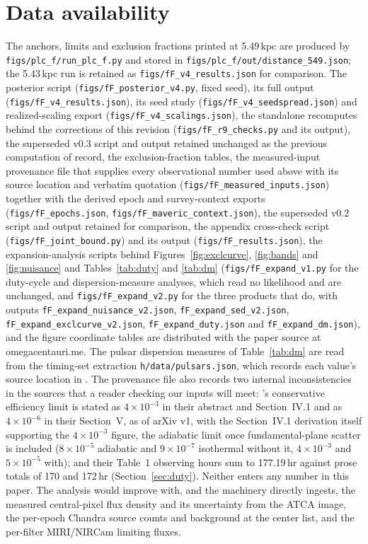 \documentclass[11pt]{article}
\begin{document}
\section*{Data availability}
\begin{sloppypar}
The anchors, limits and exclusion fractions printed at 5.49\,kpc are produced by \texttt{figs/plc\_f/run\_plc\_f.py} and stored in \texttt{figs/plc\_f/out/distance\_549.json}; the 5.43\,kpc run is retained as \texttt{figs/fF\_v4\_results.json} for comparison. The posterior script (\texttt{figs/fF\_posterior\_v4.py}, fixed seed), its full output (\texttt{figs/fF\_v4\_results.json}), its seed study (\texttt{figs/fF\_v4\_seedspread.json}) and realized-scaling export (\texttt{figs/fF\_v4\_scalings.json}), the standalone recomputes behind the corrections of this revision (\texttt{figs/fF\_r9\_checks.py} and its output), the superseded v0.3 script and output retained unchanged as the previous computation of record, the exclusion-fraction tables, the measured-input provenance file that supplies every observational number used above with its source location and verbatim quotation (\texttt{figs/fF\_measured\_inputs.json}) together with the derived epoch and survey-context exports (\texttt{figs/fF\_epochs.json}, \texttt{figs/fF\_maveric\_context.json}), the superseded v0.2 script and output retained for comparison, the appendix cross-check script (\texttt{figs/fF\_joint\_bound.py}) and its output (\texttt{figs/fF\_results.json}), the expansion-analysis scripts behind Figures~\ref{fig:exclcurve}, \ref{fig:bands} and \ref{fig:nuisance} and Tables~\ref{tab:duty} and \ref{tab:dm} (\texttt{figs/fF\_expand\_v1.py} for the duty-cycle and dispersion-measure analyses, which read no likelihood and are unchanged, and \texttt{figs/fF\_expand\_v2.py} for the three products that do, with outputs \texttt{fF\_expand\_nuisance\_v2.json}, \texttt{fF\_expand\_sed\_v2.json}, \texttt{fF\_expand\_exclcurve\_v2.json}, \texttt{fF\_expand\_duty.json} and \texttt{fF\_expand\_dm.json}), and the figure coordinate tables are distributed with the paper source at omegacentauri.me. The pulsar dispersion measures of Table~\ref{tab:dm} are read from the timing-set extraction \texttt{h/data/pulsars.json}, which records each value's source location in \citet{ColomiBernadich2026}. The provenance file also records two internal inconsistencies in the sources that a reader checking our inputs will meet: \citet{Mahida2026}'s conservative efficiency limit is stated as $4\times10^{-3}$ in their abstract and Section~IV.1 and as $4\times10^{-6}$ in their Section~V, as of arXiv v1, with the Section~IV.1 derivation itself supporting the $4\times10^{-3}$ figure, the adiabatic limit once fundamental-plane scatter is included ($8\times10^{-5}$ adiabatic and $9\times10^{-7}$ isothermal without it, $4\times10^{-3}$ and $5\times10^{-5}$ with); and their Table~1 observing hours sum to 177.19\,hr against prose totals of 170 and 172\,hr (Section~\ref{sec:duty}). Neither enters any number in this paper.
The analysis would improve with, and the machinery directly ingests, the measured central-pixel flux density and its uncertainty from the ATCA image, the per-epoch Chandra source counts and background at the center list, and the per-filter MIRI/NIRCam limiting fluxes.
\end{sloppypar}
\end{document}
